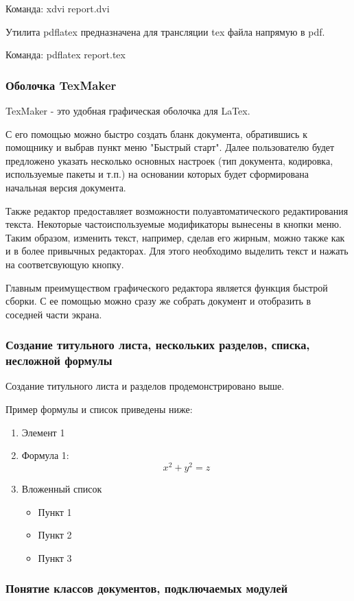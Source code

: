 \documentclass[a4paper, 12pt]{article}
\begin{document}
Команда: xdvi report.dvi

Утилита pdflatex предназначена для трансляции tex файла напрямую в pdf.

Команда: pdflatex report.tex

\subsubsection{Оболочка TexMaker}

TexMaker - это удобная графическая оболочка для LaTex.

С его помощью можно быстро создать бланк документа, обратившись к помощнику и выбрав пункт меню "Быстрый старт". Далее пользователю будет предложено указать несколько основных настроек (тип документа, кодировка, используемые пакеты и т.п.) на основании которых будет сформирована начальная версия документа.

Также редактор предоставляет возможности полуавтоматического редактирования текста. Некоторые частоиспользуемые модификаторы вынесены в кнопки меню. Таким образом, изменить текст, например, сделав его жирным, можно также как и в более привычных редакторах. Для этого необходимо выделить текст и нажать на соответсвующую кнопку.

Главным преимуществом графического редактора является функция быстрой сборки. С ее помощью можно сразу же собрать документ и отобразить в соседней части экрана.

\subsubsection{Создание титульного листа, нескольких разделов, списка, несложной формулы}

Создание титульного листа и  разделов продемонстрировано выше.

Пример формулы и список приведены ниже:
\begin{enumerate}
\item Элемент 1
\item Формула 1: $$ x^2+y^2=z $$
\item Вложенный список
	\begin{itemize}
	\item Пункт 1
	\item Пункт 2
	\item Пункт 3
	\end{itemize}
\end{enumerate}

\subsubsection{Понятие классов документов, подключаемых модулей}
\end{document}
